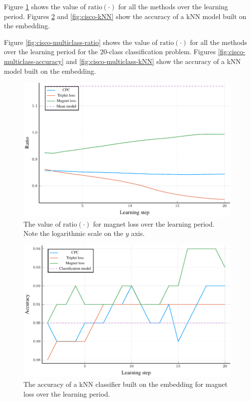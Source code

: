 Figure \ref{fig:cisco-ratio} shows the value of \( \mathrm{ratio} \left( \cdot \right) \) for all the methods over the learning period. Figures \ref{fig:cisco-accuracy} and \ref{fig:cisco-kNN} show the accuracy of a kNN model built on the embedding.

Figure \ref{fig:cisco-multiclass-ratio} shows the value of \( \mathrm{ratio} \left( \cdot \right) \) for all the methods over the learning period for the 20-class classification problem. Figures \ref{fig:cisco-multiclass-accuracy} and \ref{fig:cisco-multiclass-kNN} show the accuracy of a kNN model built on the embedding. 

\begin{figure}[h]
  \centering
  \includegraphics[width=\textwidth]{images/cisco/ratio/cisco-ratio.pdf}
  \caption{The value of \( \mathrm{ratio} \left( \cdot \right) \) for magnet loss over the learning period. Note the logarithmic scale on the \( y \) axis.}\label{fig:cisco-ratio}
\end{figure}

\begin{figure}[h]
  \centering
  \includegraphics[width=\textwidth]{images/cisco/accuracy/cisco-accuracy.pdf}
  \caption{The accuracy of a kNN classifier built on the embedding for magnet loss over the learning period.}\label{fig:cisco-accuracy}
\end{figure}

